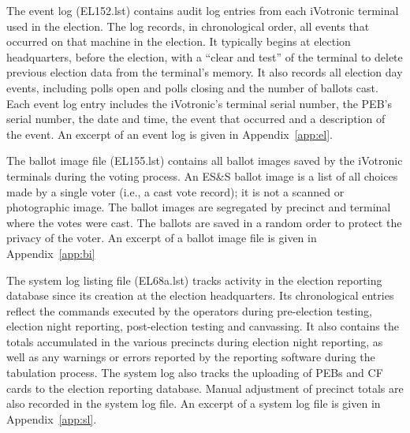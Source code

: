 The event log (EL152.lst) contains audit log entries from each
iVotronic terminal used in the election.  The log  records, in
chronological order, all events that occurred on that machine in the
election. It typically begins at election headquarters, before the
election, with a \textquotedblleft clear and
test\textquotedblright \hspace{1 mm} of the terminal to delete
previous election data from the terminal's memory. It also records all
election day events, including polls open and polls closing and the
number of ballots cast.  Each event log entry includes the iVotronic's
terminal serial number, the PEB's serial number, the date and time,
the event that occurred and a description of the event. An excerpt of
an event log is given in  Appendix~\ref{app:el}. 
 
The ballot image file (EL155.lst) contains all ballot images saved by
the iVotronic terminals during the voting process. An ES\&S ballot
image is a list of all choices made by a single voter (i.e., a cast
vote record); it is not a scanned or photographic image. The ballot
images are segregated by precinct and terminal where the votes were
cast. The ballots are saved in a random order to protect the privacy
of the voter.  An excerpt of a ballot image file is given in
Appendix~\ref{app:bi}
 
The system log listing file (EL68a.lst) tracks activity in the
election reporting database since its creation at the election
headquarters. Its chronological entries reflect the commands executed
by the operators during  pre-election testing, election night
reporting, post-election testing and canvassing. It also contains the
totals accumulated in the various precincts during election night
reporting, as well as any warnings or errors reported by the reporting
software during the tabulation process. The system log also tracks the
uploading of PEBs and CF cards to the election reporting
database. Manual adjustment of precinct totals are also recorded in
the system log file. An excerpt of a system log file is given in
Appendix~\ref{app:sl}. 
